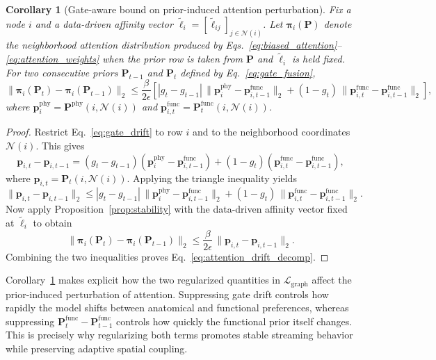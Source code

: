 \documentclass[preprint,12pt]{elsarticle}
\newtheorem{proof}{Proof}
\newtheorem{corollary}{Corollary}
\begin{document}
\begin{corollary}[Gate-aware bound on prior-induced attention perturbation]
\label{cor:attention_drift}
Fix a node $i$ and a data-driven affinity vector
$\tilde{\boldsymbol{\ell}}_{i}=[\tilde{\ell}_{ij}]_{j\in\mathcal{N}(i)}$.
Let $\boldsymbol{\pi}_{i}(\mathbf{P})$ denote the neighborhood attention distribution produced by
Eqs.~\eqref{eq:biased_attention}--\eqref{eq:attention_weights} when the prior row is taken from $\mathbf{P}$ and $\tilde{\boldsymbol{\ell}}_{i}$ is held fixed.
For two consecutive priors $\mathbf{P}_{t-1}$ and $\mathbf{P}_{t}$ defined by Eq.~\eqref{eq:gate_fusion},
\begin{equation}
\|\boldsymbol{\pi}_{i}(\mathbf{P}_{t})-\boldsymbol{\pi}_{i}(\mathbf{P}_{t-1})\|_2
\le
\frac{\beta}{2\epsilon}
\left[
|g_t-g_{t-1}|\,\|\mathbf{p}^{\mathrm{phy}}_{i}-\mathbf{p}^{\mathrm{func}}_{i,t-1}\|_2
+
(1-g_t)\,\|\mathbf{p}^{\mathrm{func}}_{i,t}-\mathbf{p}^{\mathrm{func}}_{i,t-1}\|_2
\right],
\label{eq:attention_drift_decomp}
\end{equation}
where
$\mathbf{p}^{\mathrm{phy}}_{i}=\mathbf{P}^{\mathrm{phy}}(i,\mathcal{N}(i))$
and
$\mathbf{p}^{\mathrm{func}}_{i,t}=\mathbf{P}^{\mathrm{func}}_{t}(i,\mathcal{N}(i))$.
\end{corollary}

\begin{proof}
Restrict Eq.~\eqref{eq:gate_drift} to row $i$ and to the neighborhood coordinates $\mathcal{N}(i)$.
This gives
\[
\mathbf{p}_{i,t}-\mathbf{p}_{i,t-1}
=
(g_t-g_{t-1})(\mathbf{p}^{\mathrm{phy}}_{i}-\mathbf{p}^{\mathrm{func}}_{i,t-1})
+
(1-g_t)(\mathbf{p}^{\mathrm{func}}_{i,t}-\mathbf{p}^{\mathrm{func}}_{i,t-1}),
\]
where $\mathbf{p}_{i,t}=\mathbf{P}_t(i,\mathcal{N}(i))$.
Applying the triangle inequality yields
\[
\|\mathbf{p}_{i,t}-\mathbf{p}_{i,t-1}\|_2
\le
|g_t-g_{t-1}|\,\|\mathbf{p}^{\mathrm{phy}}_{i}-\mathbf{p}^{\mathrm{func}}_{i,t-1}\|_2
+
(1-g_t)\,\|\mathbf{p}^{\mathrm{func}}_{i,t}-\mathbf{p}^{\mathrm{func}}_{i,t-1}\|_2.
\]
Now apply Proposition~\ref{prop:stability} with the data-driven affinity vector fixed at $\tilde{\boldsymbol{\ell}}_{i}$ to obtain
\[
\|\boldsymbol{\pi}_{i}(\mathbf{P}_{t})-\boldsymbol{\pi}_{i}(\mathbf{P}_{t-1})\|_2
\le
\frac{\beta}{2\epsilon}\,
\|\mathbf{p}_{i,t}-\mathbf{p}_{i,t-1}\|_2.
\]
Combining the two inequalities proves Eq.~\eqref{eq:attention_drift_decomp}.
\end{proof}

Corollary~\ref{cor:attention_drift} makes explicit how the two regularized quantities in $\mathcal{L}_{\mathrm{graph}}$ affect the prior-induced perturbation of attention.
Suppressing gate drift controls how rapidly the model shifts between anatomical and functional preferences,
whereas suppressing $\mathbf{P}^{\mathrm{func}}_t-\mathbf{P}^{\mathrm{func}}_{t-1}$ controls how quickly the functional prior itself changes.
This is precisely why regularizing both terms promotes stable streaming behavior while preserving adaptive spatial coupling.
\end{document}
